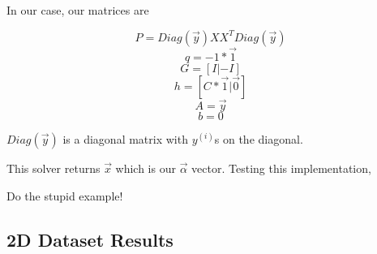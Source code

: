 \documentclass[a4paper,twoside]{article}
\begin{document}
In our case, our matrices are 

\begin{equation*}
P = Diag(\overrightarrow{y}) X X^T Diag(\overrightarrow{y})
\end{equation*}
\begin{equation*}
q = -1 * \overrightarrow{1}
\end{equation*}
\begin{equation*}
G = [I | -I]
\end{equation*}
\begin{equation*}
h = [C * \overrightarrow{1} | \overrightarrow{0}]
\end{equation*}
\begin{equation*}
A = \overrightarrow{y}
\end{equation*}
\begin{equation*}
b = 0
\end{equation*}

$Diag(\overrightarrow{y})$ is a diagonal matrix with $y^{(i)}$s on the diagonal.

This solver returns $\overrightarrow{x}$ which is our $\overrightarrow{\alpha}$ vector. Testing this implementation,

Do the stupid example!

\subsection{2D Dataset Results}
\end{document}
